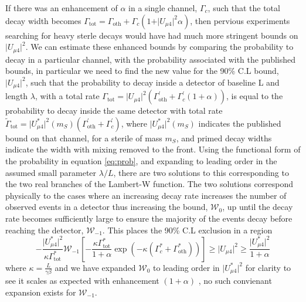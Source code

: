 \documentclass[11pt, a4paper]{article}
\begin{document}
If there was an enhancement of $\alpha$ in a single channel, $\Gamma_c$, such that the total decay width becomes $\Gamma_\text{tot} = \Gamma_\text{oth}+\Gamma_c (1+\vert U_{\mu 4}\vert^2 \alpha)$, then pervious experiments searching for heavy sterle decays would have had much more stringent bounds on $\vert U_{\mu 4} \vert^2$. We can estimate these enhanced bounds by comparing the probability to decay in a particular channel, with the probability associated with the published bounds, in particular we need to find the new value for the 90\% C.L bound, $\vert U_{\mu 4}\vert^2$, such that the probability to decay inside a detector of baseline L and length $\lambda$, with a total rate  $\Gamma_\text{tot} = \vert U_{\mu 4}\vert^2 \left(\Gamma_\text{oth}^\prime+\Gamma_c^\prime (1+\alpha)\right)$, is equal to the probability to decay inside the same detector with total rate $\tilde{\Gamma}_\text{tot} = \vert U_{\mu 4}^*\vert^2(m_S) \left(\Gamma_\text{oth}^\prime+\Gamma_c^\prime\right)$, where $\vert U_{\mu 4}^*\vert^2(m_S) $ indicates the published bound on that channel, for a sterile of mass $m_S$, and primed decay widths indicate the width with mixing removed to the front. Using the functional form of the probability in equation \ref{eq:prob}, and expanding to leading order in the assumed small parameter $\lambda/L$, there are two solutions to this corresponding to the two real branches of the Lambert-W function. The two solutions correspond physically to the cases where an increasing decay rate increases the number of observed events in a detector thus increasing the bound, $\mathcal{W}_0$, up until the decay rate becomes sufficiently large to ensure the majority of the events decay before reaching the detector, $\mathcal{W}_{-1}$. This places the 90\% C.L exclusion in a region 
\[	-\frac{\vert U_{\mu 4}^* \vert^2}{ \kappa \Gamma_\text{tot}^{*}} \mathcal{W}_{-1} \left[-\frac{\kappa \Gamma_\text{tot}^{*}}{1+\alpha} \exp\left( -\kappa(\Gamma_c^*+\Gamma_\text{oth}^*) \right)     \right]	\geq \vert U_{\mu 4} \vert^2 \geq \frac{\vert U_{\mu 4}^* \vert^2}{1+\alpha}
\]
where $\kappa = \frac{L}{\gamma \beta}$ and we have expanded $\mathcal{W}_0$ to leading order in $\vert U_{\mu 4}^*\vert^2$ for clarity to see it scales as expected with enhancement $(1+\alpha)$ , no such convienant expansion exists for  $\mathcal{W}_{-1}$.  
\end{document}
